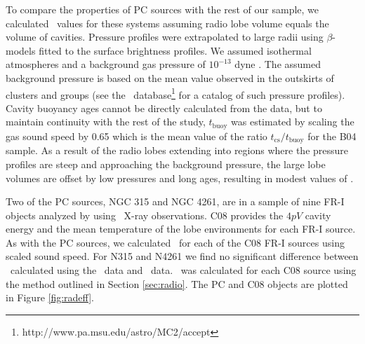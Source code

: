 \documentclass{emulateapj}
\begin{document}
To compare the properties of PC sources with the rest of our sample,
we calculated \pcav\ values for these systems assuming radio lobe
volume equals the volume of cavities. Pressure profiles were
extrapolated to large radii using $\beta$-models \citep{betamodel}
fitted to the surface brightness profiles. We assumed isothermal
atmospheres and a background gas pressure of $10^{-13}$ dyne
\pcmsq. The assumed background pressure is based on the mean value
observed in the outskirts of clusters and groups (see the
\accept\ database\footnote{http://www.pa.msu.edu/astro/MC2/accept} for
a catalog of such pressure profiles). Cavity buoyancy ages cannot be
directly calculated from the data, but to maintain continuity with the
rest of the study, $t_{\mathrm{buoy}}$ was estimated by scaling the
gas sound speed by 0.65 which is the mean value of the ratio
$t_{\mathrm{cs}}/t_{\mathrm{buoy}}$ for the B04 sample. As a result of
the radio lobes extending into regions where the pressure profiles are
steep and approaching the background pressure, the large lobe volumes
are offset by low pressures and long ages, resulting in modest values
of \pcav.

Two of the PC sources, NGC 315 and NGC 4261, are in a sample of nine
FR-I objects analyzed by \citet[][hereafter C08]{2008MNRAS.386.1709C}
using \xmm\ X-ray observations. C08 provides the $4pV$ cavity energy
and the mean temperature of the lobe environments for each FR-I
source. As with the PC sources, we calculated \pcav\ for each of the
C08 FR-I sources using scaled sound speed. For N315 and N4261 we find
no significant difference between \pcav\ calculated using the
\chandra\ data and \xmm\ data. \phigh\ was calculated for each C08
source using the method outlined in Section \ref{sec:radio}. The PC
and C08 objects are plotted in Figure \ref{fig:radeff}.
\end{document}
